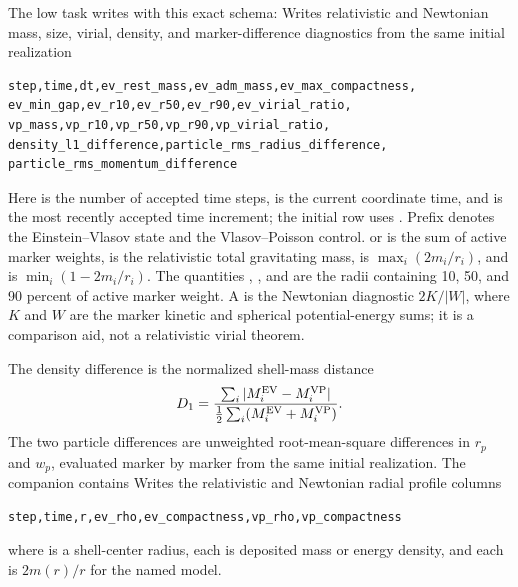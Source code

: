 The low task writes  with this exact schema:
{}
{Writes relativistic and Newtonian mass, size, virial, density, and
 marker-difference diagnostics from the same initial realization}
\begin{lstlisting}[basicstyle=\ttfamily\scriptsize]
step,time,dt,ev_rest_mass,ev_adm_mass,ev_max_compactness,
ev_min_gap,ev_r10,ev_r50,ev_r90,ev_virial_ratio,
vp_mass,vp_r10,vp_r50,vp_r90,vp_virial_ratio,
density_l1_difference,particle_rms_radius_difference,
particle_rms_momentum_difference
\end{lstlisting}
Here  is the number of accepted time steps,  is the
current coordinate time, and  is the most recently accepted time
increment; the initial row uses .  Prefix  denotes the
Einstein--Vlasov state and  the Vlasov--Poisson control.
 or  is the sum of active marker weights,
 is the relativistic total gravitating mass,
 is \(\max_i(2m_i/r_i)\), and  is
\(\min_i(1-2m_i/r_i)\).  The quantities , , and
 are the radii containing 10, 50, and 90 percent of active marker
weight.  A  is the Newtonian diagnostic \(2K/|W|\), where
\(K\) and \(W\) are the marker kinetic and spherical potential-energy sums;
it is a comparison aid, not a relativistic virial theorem.

The density difference is the normalized shell-mass distance
\[
 D_1=\frac{\sum_i|M_i^{\rm EV}-M_i^{\rm VP}|}
 {\tfrac12\sum_i(M_i^{\rm EV}+M_i^{\rm VP})}.
\]
The two particle differences are unweighted root-mean-square differences in
\(r_p\) and \(w_p\), evaluated marker by marker from the same initial realization.
The companion  contains
{}
{Writes the relativistic and Newtonian radial profile columns}
\begin{lstlisting}[basicstyle=\ttfamily\scriptsize]
step,time,r,ev_rho,ev_compactness,vp_rho,vp_compactness
\end{lstlisting}
where  is a shell-center radius, each  is deposited mass or
energy density, and each  is \(2m(r)/r\) for the named
model.


